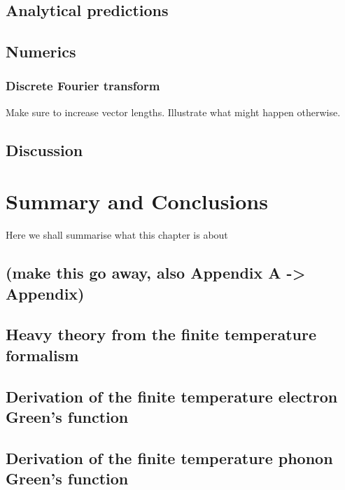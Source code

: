 \documentclass[12pt]{report}
\newcommand{\todo}[1]{{\leavevmode\color{todo}#1}}
\begin{document}
\section{Analytical predictions}

\section{Numerics}

\subsection{Discrete Fourier transform}

\todo{Make sure to increase vector lengths. Illustrate what might happen otherwise.}

\section{Discussion}


\chapter{Summary and Conclusions}
\todo{Here we shall summarise what this chapter is about}


\begin{appendices}
\chapter{(make this go away, also Appendix A -> Appendix)}

\section{Heavy theory from the finite temperature formalism}

\section{Derivation of the finite temperature electron Green's function}

\section{Derivation of the finite temperature phonon Green's function}
\end{appendices}



\end{document}
